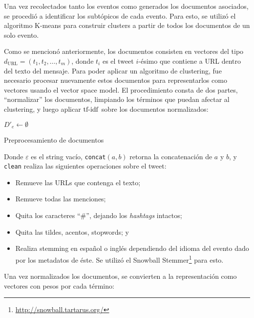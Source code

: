    Una vez recolectados tanto los eventos como generados los
    documentos asociados, se procedió a identificar los subtópicos de
    cada evento. Para esto, se utilizó el algoritmo K-means para
    construir clusters a partir de todos los documentos de un solo
    evento.

    Como se mencionó anteriormente, los documentos consisten en
    vectores del tipo $d_{\textrm{URL}}=(t_1,t_2,\ldots,t_m)$, donde
    $t_i$ es el tweet $i$-ésimo que contiene a URL dentro del texto
    del mensaje. Para poder aplicar un algoritmo de clustering, fue
    necesario procesar nuevamente estos documentos para representarlos
    como vectores usando el vector space model. El procedimiento
    consta de dos partes, ``normalizar'' los documentos, limpiando los
    términos que puedan afectar al clustering, y luego aplicar
    $\operatorname{tf-idf}$ sobre los documentos normalizados:

\begin{algorithm}[H]
 $D'_e \leftarrow \emptyset$\;
 \caption{Preprocesamiento de documentos}
\end{algorithm}

    Donde $\varepsilon$ es el string vacío, \texttt{concat}$(a,b)$ retorna
    la concatenación de $a$ y $b$, y \texttt{clean} realiza las siguientes
    operaciones sobre el tweet:

\begin{itemize}
\item Remueve las URLs que contenga el texto;
\item Remueve todas las menciones;
\item Quita los caracteres ``\#'', dejando los \emph{hashtags} intactos;
\item Quita las tildes, acentos, stopwords; y
\item Realiza stemming en español o inglés dependiendo del idioma del
      evento dado por los metadatos de éste. Se utilizó el Snowball
      Stemmer\footnote{\href{http://snowball.tartarus.org/}{http://snowball.tartarus.org/} } para esto.
\end{itemize}
    Una vez normalizados los documentos, se convierten a la
    representación como vectores con pesos por cada término:

